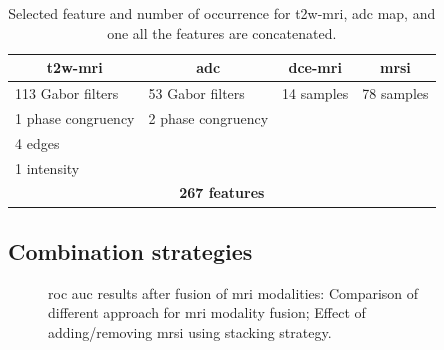 \documentclass[a4paper,num-refs]{wiley-article}
\begin{document}
\begin{table}
  \caption{Selected feature and number of occurrence for \acs*{t2w}-\acs*{mri},
    \acs*{adc} map, and one all the features are concatenated.}
  \centering
  \scriptsize
  \begin{tabular}{llll}
    \toprule
    \multicolumn{1}{c}{\textbf{\acs*{t2w}-\acs*{mri}}} & \multicolumn{1}{c}{\textbf{\acs*{adc}}} & \multicolumn{1}{c}{\textbf{\acs*{dce}-\acs*{mri}}} & \multicolumn{1}{c}{\textbf{\acs*{mrsi}}} \\
    \midrule
    113 Gabor filters & 53 Gabor filters & 14 samples  & 78 samples \\
    1 phase congruency & 2 phase congruency & & \\ 
    4 edges & & & \\
    1 intensity & & & \\
    \midrule
    \multicolumn{4}{c}{\textbf{267 features}} \\
    \bottomrule
  \end{tabular}
  \label{tab:selfeatocc}
\end{table}

\subsection{Combination strategies}\label{exp:classification}

\begin{figure}
  \hspace*{\fill}
  \hfill
  \hspace*{\fill}
  \caption[]{\ac{roc} \ac{auc} results after fusion of \ac{mri} modalities:
    \protect{} Comparison of different approach for
    \ac{mri} modality fusion;
    \protect{} Effect of adding/removing \ac{mrsi}
    using stacking strategy.}
  \label{fig:DCE-norm}
\end{figure}
\end{document}
